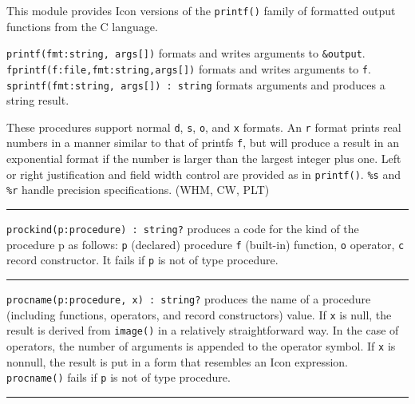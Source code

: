 This module provides Icon versions of the
\texttt{printf()} family of formatted output functions
from the C language.

\texttt{printf(fmt:string, args[])} formats and writes arguments to
\texttt{\&output}.\\
\texttt{fprintf(f:file,fmt:string,args[])} formats and writes arguments
to \texttt{f}.\\
\texttt{sprintf(fmt:string, args[]) : string} formats arguments and
produces a string result.

These procedures support normal \texttt{d}, \texttt{s}, \texttt{o}, and
\texttt{x} formats. An \texttt{{\textquotedbl}r{\textquotedbl}} format
prints real numbers in a manner similar to that of
printf{\textquotesingle}s \texttt{{\textquotedbl}f{\textquotedbl}}, but
will produce a result in an exponential format if the number is larger
than the largest integer plus one. Left or right justification and
field width control are provided as in \texttt{printf()}. \texttt{\%s}
and \texttt{\%r} handle precision specifications. (WHM, CW, PLT)

\vspace{0.25cm}\hrule{}

\texttt{prockind(p:procedure) : string?} produces a code for the kind of
the procedure p as follows: \texttt{{\textquotedbl}p{\textquotedbl}}
(declared) procedure \texttt{{\textquotedbl}f{\textquotedbl}}
(built-in) function, \texttt{{\textquotedbl}o{\textquotedbl}} operator,
\texttt{{\textquotedbl}c{\textquotedbl}} record
constructor. It fails if \texttt{p} is not of type
procedure. 

\vspace{0.25cm}\hrule{}

\texttt{procname(p:procedure, x) : string?} produces the name of a
procedure (including functions, operators, and record
constructors) value. If \texttt{x} is null,
the result is derived from \texttt{image()} in a relatively
straightforward way. In the case of operators, the number of arguments
is appended to the operator symbol. If \texttt{x} is nonnull, the
result is put in a form that resembles an Icon expression.
\texttt{procname()} fails if \texttt{p} is not of type procedure. 

\vspace{0.25cm}\hrule{}

